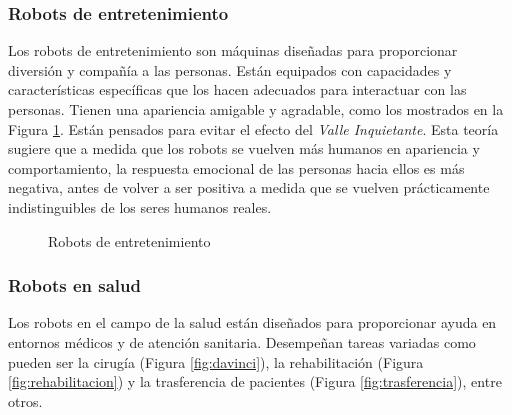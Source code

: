 \subsubsection{Robots de entretenimiento}
Los robots de entretenimiento son máquinas diseñadas para proporcionar diversión y compañía a las personas. Están equipados con capacidades y 
características específicas que los hacen adecuados para interactuar con las personas. Tienen una apariencia amigable y agradable, como los mostrados 
en la Figura \ref{fig:entretenimiento}. Están pensados para 
evitar el efecto del \textit{Valle Inquietante}. Esta teoría sugiere que a medida que los robots se vuelven más humanos en apariencia y comportamiento, la respuesta 
emocional de las personas hacia ellos es más negativa, antes de volver a ser positiva a medida que se vuelven prácticamente 
indistinguibles de los seres humanos reales.
\begin{figure} [ht!]
  \centering    
  \hspace{1cm}
  \caption{Robots de entretenimiento}
  \label{fig:entretenimiento}
\end{figure}

\subsubsection{Robots en salud}
Los robots en el campo de la salud están diseñados para proporcionar ayuda en entornos médicos y de atención sanitaria. Desempeñan tareas 
variadas como pueden ser la cirugía (Figura \ref{fig:davinci}), la rehabilitación (Figura \ref{fig:rehabilitacion}) y la trasferencia de pacientes (Figura \ref{fig:trasferencia}), entre otros.

